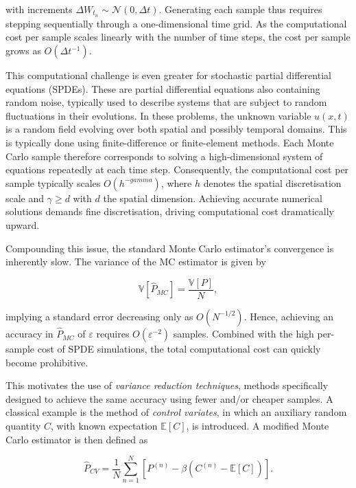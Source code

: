 with increments $\Delta W_{t_n} \sim \mathcal{N}(0, \Delta t)$. Generating each sample thus requires
stepping sequentially through a one-dimensional time grid. As the computational cost 
per sample scales linearly with the number of time steps, the cost per sample grows as 
$O(\Delta t^{-1})$.

This computational challenge is even greater for stochastic partial differential equations (SPDEs).
These are partial differential equations also containing random noise, typically used to 
describe systems that are subject to random fluctuations in their evolutions.
In these problems, the unknown variable $u(x,t)$ is a random field evolving over both spatial and 
possibly temporal domains. This is typically done using finite-difference or finite-element methods.
Each Monte Carlo sample therefore corresponds to solving a high-dimensional system of equations repeatedly at 
each time step. Consequently, the computational cost per sample typically scales 
$O(h^{-gamma})$, where $h$ denotes the spatial discretisation scale and $\gamma \ge d$ with $d$ 
the spatial dimension. Achieving accurate numerical solutions demands fine discretisation, 
driving computational cost dramatically upward.


Compounding this issue, the standard Monte Carlo estimator's convergence is inherently slow. The 
variance of the MC estimator is given by 

\begin{equation*}
    \mathbb{V}[\hat{P}_{MC}] = \frac{\mathbb{V}[P]}{N},
\end{equation*}

implying a standard error decreasing only as $O(N^{-1/2})$. Hence, achieving an accuracy in 
$\hat{P}_{MC}$ of $\varepsilon$ requires $O(\varepsilon^{-2})$ samples. Combined with the high
per-sample cost of SPDE simulations, the total computational cost can 
quickly become prohibitive. 

This motivates the use of \textit{variance reduction techniques}, methods specifically designed to 
achieve the same accuracy using fewer and/or cheaper samples. A classical example is the method of 
\textit{control variates}, in which an auxiliary random quantity $C$, with known expectation 
$\mathbb{E}[C]$, is introduced. A modified Monte Carlo estimator is then defined as

\begin{equation}
    \hat{P}_{CV} = \frac{1}{N}\sum_{n=1}^{N}\left[P^{(n)} - \beta(C^{(n)} - \mathbb{E}[C])\right].
\end{equation}

